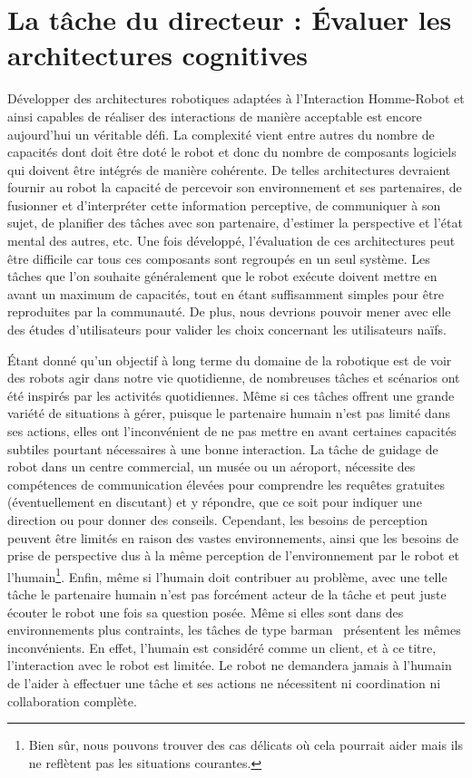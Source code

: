 \section*{La tâche du directeur : Évaluer les architectures cognitives}

Développer des architectures robotiques adaptées à l'Interaction Homme-Robot et ainsi capables de réaliser des interactions de manière acceptable est encore aujourd'hui un véritable défi. La complexité vient entre autres du nombre de capacités dont doit être doté le robot et donc du nombre de composants logiciels qui doivent être intégrés de manière cohérente. De telles architectures devraient fournir au robot la capacité de percevoir son environnement et ses partenaires, de fusionner et d'interpréter cette information perceptive, de communiquer à son sujet, de planifier des tâches avec son partenaire, d'estimer la perspective et l'état mental des autres, etc. Une fois développé, l'évaluation de ces architectures peut être difficile car tous ces composants sont regroupés en un seul système. Les tâches que l'on souhaite généralement que le robot exécute doivent mettre en avant un maximum de capacités, tout en étant suffisamment simples pour être reproduites par la communauté. De plus, nous devrions pouvoir mener avec elle des études d'utilisateurs pour valider les choix concernant les utilisateurs naïfs.

Étant donné qu'un objectif à long terme du domaine de la robotique est de voir des robots agir dans notre vie quotidienne, de nombreuses tâches et scénarios ont été inspirés par les activités quotidiennes. Même si ces tâches offrent une grande variété de situations à gérer, puisque le partenaire humain n'est pas limité dans ses actions, elles ont l'inconvénient de ne pas mettre en avant certaines capacités subtiles pourtant nécessaires à une bonne interaction.
La tâche de guidage de robot \cite{satake_2015_should} dans un centre commercial, un musée ou un aéroport, nécessite des compétences de communication élevées pour comprendre les requêtes gratuites (éventuellement en discutant) et y répondre, que ce soit pour indiquer une direction ou pour donner des conseils. Cependant, les besoins de perception peuvent être limités en raison des vastes environnements, ainsi que les besoins de prise de perspective dus à la même perception de l'environnement par le robot et l'humain\footnote{Bien sûr, nous pouvons trouver des cas délicats où cela pourrait aider mais ils ne reflètent pas les situations courantes.}. Enfin, même si l'humain doit contribuer au problème, avec une telle tâche le partenaire humain n'est pas forcément acteur de la tâche et peut juste écouter le robot une fois sa question posée. Même si elles sont dans des environnements plus contraints, les tâches de type barman~\cite{petrick_2012_social} présentent les mêmes inconvénients. En effet, l'humain est considéré comme un client, et à ce titre, l'interaction avec le robot est limitée. Le robot ne demandera jamais à l'humain de l'aider à effectuer une tâche et ses actions ne nécessitent ni coordination ni collaboration complète.

